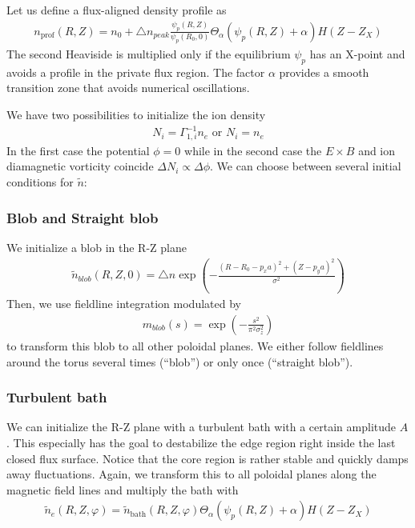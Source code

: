 Let us define a flux-aligned density profile as
\begin{align} \label{eq:density_profile}
  n_{\text{prof}}(R,Z)=
      n_0 + \triangle n_{peak}\frac{\psi_p(R,Z) }{\psi_p(R_0,0)}\Theta_{\alpha}(\psi_p(R, Z)+\alpha) H(Z-Z_X)
\end{align}
The second Heaviside is multiplied only if the equilibrium $\psi_p$ has an
X-point and avoids a profile in the private flux region. The factor $\alpha$ provides a smooth transition
zone that avoids numerical oscillations.


We have two possibilities to initialize the ion density
\begin{align} \label{eq:initphi}
  N_i = \Gamma_{1,i}^{-1} n_e \text{ or } N_i = n_e
\end{align}
In the first case the potential $\phi= 0$ while in the second case
the $E\times B$ and ion diamagnetic vorticity coincide $\Delta N_i \propto \Delta \phi$.
We can choose between several initial conditions for $\tilde n$:

\subsubsection{Blob and Straight blob}
We initialize a blob in the R-Z plane
\begin{align} \label{eq:initial_blob}
  \tilde n_{blob}(R,Z,0) = \triangle n \exp\left( -\frac{(R - R_0 - p_x a)^2 + (Z-p_ya)^2}{\sigma^2} \right)
\end{align}
Then, we use fieldline integration modulated by 
\begin{align}
  m_{blob}(s) = \exp\left( -\frac{s^2 }{\pi^2\sigma_z^2} \right)
\end{align}
to transform this blob to all other poloidal
planes.
We either follow fieldlines around the torus several times (``blob'') or only once
(``straight blob'').
\subsubsection{Turbulent bath}
We can initialize the R-Z plane with a turbulent bath with a certain amplitude $A$.
This especially has the goal to destabilize the edge region right inside the
last closed flux surface. Notice that the core region is rather stable
and quickly damps away fluctuations.
Again, we transform this to all poloidal planes along the magnetic field lines and multiply the bath with
\begin{align} \label{eq:initial_turbulent}
\tilde n_e(R,Z,\varphi) = \tilde n_{\text{bath}}(R,Z,\varphi)\Theta_{\alpha}(\psi_p(R, Z)+\alpha) H(Z-Z_X)
\end{align}
